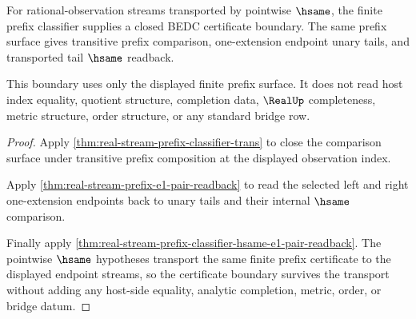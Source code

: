 \begin{theorem}
\label{thm:real-stream-prefix-certificate-boundary}
For rational-observation streams transported by pointwise $\hsame$, the finite
prefix classifier supplies a closed BEDC certificate boundary. The same prefix
surface gives transitive prefix comparison, one-extension endpoint unary
tails, and transported tail $\hsame$ readback.

This boundary uses only the displayed finite prefix surface. It does not read
host index equality, quotient structure, completion data, $\RealUp$
completeness, metric structure, order structure, or any standard bridge row.
\end{theorem}
\begin{proof}
Apply \autoref{thm:real-stream-prefix-classifier-trans} to close the comparison
surface under transitive prefix composition at the displayed observation
index.

Apply \autoref{thm:real-stream-prefix-e1-pair-readback} to read the selected
left and right one-extension endpoints back to unary tails and their internal
$\hsame$ comparison.

Finally apply
\autoref{thm:real-stream-prefix-classifier-hsame-e1-pair-readback}. The
pointwise $\hsame$ hypotheses transport the same finite prefix certificate to
the displayed endpoint streams, so the certificate boundary survives the
transport without adding any host-side equality, analytic completion, metric,
order, or bridge datum.
\end{proof}
